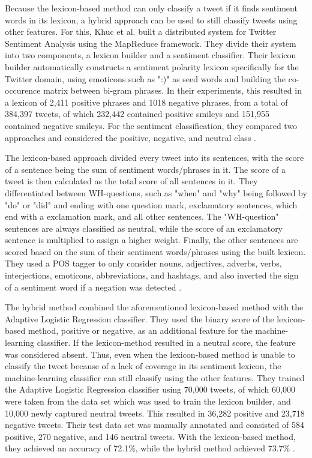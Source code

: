 Because the lexicon-based method can only classify a tweet if it finds sentiment words in its lexicon, a hybrid approach can be used to still classify tweets using other features. For this, Khuc et al. built a distributed system for Twitter Sentiment Analysis using the MapReduce framework. They divide their system into two components, a lexicon builder and a sentiment classifier. Their lexicon builder automatically constructs a sentiment polarity lexicon specifically for the Twitter domain, using emoticons such as ":)" as seed words and building the co-occurence matrix between bi-gram phrases. In their experiments, this resulted in a lexicon of 2,411 positive phrases and 1018 negative phrases, from a total of 384,397 tweets, of which 232,442 contained positive smileys and 151,955 contained negative smileys. For the sentiment classification, they compared two approaches and considered the positive, negative, and neutral class \cite{khuc}.

The lexicon-based approach divided every tweet into its sentences, with the score of a sentence being the sum of sentiment words/phrases in it. The score of a tweet is then calculated as the total score of all sentences in it. They differentiated between WH-questions, such as "when" and "why" being followed by "do" or "did" and ending with one question mark, exclamatory sentences, which end with a exclamation mark, and all other sentences. The "WH-question" sentences are always classified as neutral, while the score of an exclamatory sentence is multiplied to assign a higher weight. Finally, the other sentences are scored based on the sum of their sentiment words/phrases using the built lexicon. They used a POS tagger to only consider nouns, adjectives, adverbs, verbs, interjections, emoticons, abbreviations, and hashtags, and also inverted the sign of a sentiment word if a negation was detected \cite{khuc}.

The hybrid method combined the aforementioned lexicon-based method with the Adaptive Logistic Regression classifier. They used the binary score of the lexicon-based method, positive or negative, as an additional feature for the machine-learning classifier. If the lexicon-method resulted in a neutral score, the feature was considered absent. Thus, even when the lexicon-based method is unable to classify the tweet because of a lack of coverage in its sentiment lexicon, the machine-learning classifier can still classify using the other features. They trained the Adaptive Logistic Regression classifier using 70,000 tweets, of which 60,000 were taken from the data set which was used to train the lexicon builder, and 10,000 newly captured neutral tweets. This resulted in 36,282 positive and 23,718 negative tweets. Their test data set was manually annotated and consisted of 584 positive, 270 negative, and 146 neutral tweets. With the lexicon-based method, they achieved an accuracy of 72.1\%, while the hybrid method achieved 73.7\% \cite{khuc}.










